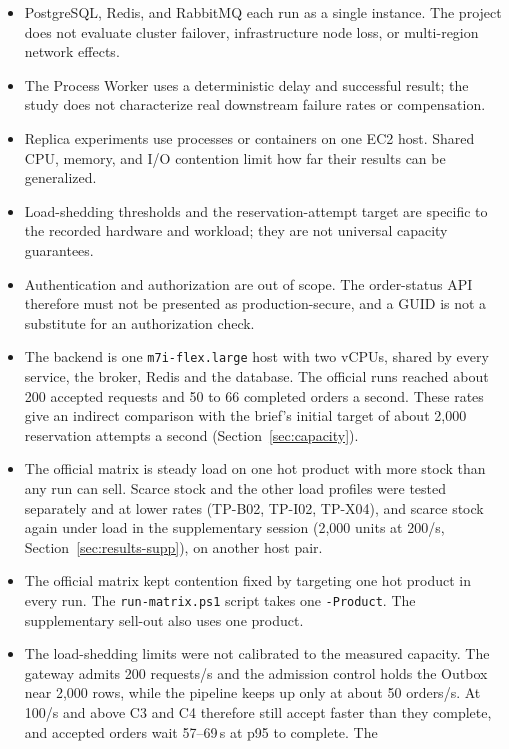 \documentclass[a4paper]{report}
\begin{document}
\begin{itemize}
  \item PostgreSQL, Redis, and RabbitMQ each run as a single instance. The project
    does not evaluate cluster failover, infrastructure node loss, or multi-region
    network effects.
  \item The Process Worker uses a deterministic delay and successful result; the
    study does not characterize real downstream failure rates or compensation.
  \item Replica experiments use processes or containers on one EC2 host. Shared CPU,
    memory, and I/O contention limit how far their results can be generalized.
  \item Load-shedding thresholds and the reservation-attempt target are specific to
    the recorded hardware and workload; they are not universal capacity guarantees.
  \item Authentication and authorization are out of scope. The order-status API
    therefore must not be presented as production-secure, and a GUID is not a
    substitute for an authorization check.
  \item The backend is one \texttt{m7i-flex.large} host with two vCPUs, shared
    by every service, the broker, Redis and the database. The official runs
    reached about 200 accepted requests and 50 to 66 completed orders a second.
    These rates give an indirect comparison with the brief's initial target
    of about 2,000 reservation attempts a second (Section~\ref{sec:capacity}).
  \item The official matrix is steady load on one hot product with more stock
    than any run can sell. Scarce stock and the other load profiles were
    tested separately and at lower rates (TP-B02, TP-I02, TP-X04), and scarce
    stock again under load in the supplementary session (2,000 units at
    200/s, Section~\ref{sec:results-supp}), on another host pair.
  \item The official matrix kept contention fixed by targeting one hot product
    in every run. The \texttt{run-matrix.ps1} script takes one
    \texttt{-Product}. The supplementary sell-out also uses one product.
  \item The load-shedding limits were not calibrated to the measured capacity.
    The gateway admits 200 requests/s and the admission control holds the
    Outbox near 2,000 rows, while the pipeline keeps up only at about 50
    orders/s. At 100/s and above C3 and C4 therefore still accept faster than
    they complete, and accepted orders wait 57--69\,s at p95 to complete. The

\end{itemize}
\end{document}
